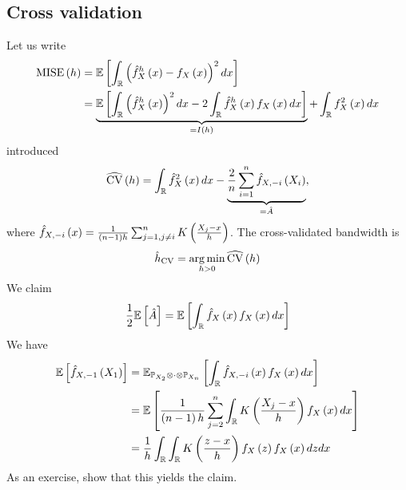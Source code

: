 \subsection{Cross validation}
Let us write
\begin{equation*}
	\begin{split}
		\mathrm{MISE}\left(h\right) & = \mathbb{E}\left[\int_{\mathbb{R}} \left(\hat{f}^h_X\left(x\right)-f_X\left(x\right) \right)^2dx\right]                                                                                  \\
		                    & = \underbrace{\mathbb{E}\left[\int_{\mathbb{R}} \left(\hat{f}^h_X \left(x\right)\right)^2 dx - 2\int_{\mathbb{R}} \hat{f}^h_X\left(x\right) f_X\left(x\right)dx \right]}_{=I\left(h\right)} + \int_{\mathbb{R}} f_X^2\left(x\right)dx
	\end{split}
\end{equation*}
introduced
\begin{equation*}
	\widehat{\mathrm{CV}}\left(h\right) = \int_{\mathbb{R}} \hat{f}_X^2 \left(x\right)dx - \underbrace{\frac{2}{n} \sum_{i=1}^n \hat{f}_{X,-i}\left(X_i\right)}_{=\hat{A}},
\end{equation*}
where $\hat{f}_{X,-i}\left(x\right) = \frac{1}{\left(n-1\right)h} \sum_{j=1,j\neq i}^n K\left(\frac{X_j-x}{h}\right)$. The cross-validated bandwidth is
\begin{equation*}
	\hat{h}_{\mathrm{CV}} = \operatorname*{arg\,min}_{h>0 }\widehat{\mathrm{CV}}\left(h\right)
\end{equation*}
We claim
\begin{equation*}
	\frac{1}{2}\mathbb{E}\left[\hat{A}\right]= \mathbb{E}\left[\int_{\mathbb{R}} \hat{f}_X\left(x\right) f_X\left(x\right) dx\right]
\end{equation*}
We have
\begin{equation*}
	\begin{split}
		\mathbb{E}\left[\hat{f}_{X,-1}\left(X_1\right)\right] & = \mathbb{E}_{\mathbb{P}_{X_2}\otimes  \cdot\otimes \mathbb{P}_{X_n}}\left[\int_{\mathbb{R}} \hat{f}_{X,-i}\left(x\right)f_X\left(x\right) dx\right] \\
		                               & = \mathbb{E}\left[\frac{1}{\left(n-1\right) h}\sum_{j=2}^n \int_{\mathbb{R}} K\left(\frac{X_j-x}{h}\right)f_X\left(x\right) dx\right]        \\
		                               & =\frac{1}{h} \int_{\mathbb{R}}\int_{\mathbb{R}} K\left(\frac{z-x}{h}\right) f_X\left(z\right) f_X\left(x\right) dz dx
	\end{split}
\end{equation*}
As an exercise, show that this yields the claim.

